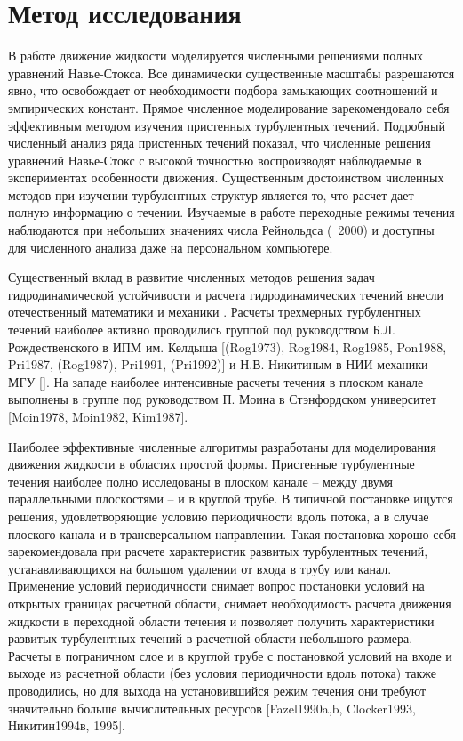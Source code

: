 
\chapter{Метод исследования}

В работе движение жидкости моделируется численными решениями полных уравнений Навье-Стокса. Все динамически существенные масштабы разрешаются явно, что освобождает от необходимости подбора замыкающих соотношений и эмпирических констант. Прямое численное моделирование зарекомендовало себя эффективным методом изучения пристенных турбулентных течений. Подробный численный анализ ряда пристенных течений показал, что численные решения уравнений Навье-Стокс с высокой точностью воспроизводят наблюдаемые в экспериментах особенности движения. Существенным достоинством численных методов при изучении турбулентных структур является то, что расчет дает полную информацию о течении. Изучаемые в работе переходные режимы течения наблюдаются при небольших значениях числа Рейнольдса (~2000) и доступны для численного анализа даже на персональном компьютере. 

Существенный вклад в развитие численных методов решения задач гидродинамической устойчивости и расчета гидродинамических течений внесли отечественный математики и механики \cite{Lad1970, Jud1984, Bab1986, Ger1972, Sch1973, Gold1977, Bel1984, Sch2010, Kul2014}. Расчеты трехмерных турбулентных течений наиболее активно проводились группой под руководством Б.Л. Рождественского в ИПМ им. Келдыша [(Rog1973), Rog1984, Rog1985, Pon1988, Pri1987, (Rog1987), Pri1991, (Pri1992)] и Н.В. Никитиным в НИИ механики МГУ []. На западе наиболее интенсивные расчеты течения в плоском канале выполнены в группе под руководством П. Моина в Стэнфордском университет [Moin1978, Moin1982, Kim1987]. 

Наиболее эффективные численные алгоритмы разработаны для моделирования движения жидкости в областях простой формы. Пристенные турбулентные течения наиболее полно исследованы в плоском канале -- между двумя параллельными плоскостями -- и в круглой трубе. В типичной постановке ищутся решения, удовлетворяющие условию периодичности вдоль потока, а в случае плоского канала и в трансверсальном направлении. Такая постановка хорошо себя зарекомендовала при расчете характеристик развитых турбулентных течений, устанавливающихся на большом удалении от входа в трубу или канал. Применение условий периодичности снимает вопрос постановки условий на открытых границах расчетной области, снимает необходимость расчета движения жидкости в переходной области течения и позволяет получить характеристики развитых турбулентных течений в расчетной области небольшого размера. Расчеты в пограничном слое и в круглой трубе с постановкой условий на входе и выходе из расчетной области (без условия периодичности вдоль потока) также проводились, но для выхода на установившийся режим течения они требуют значительно больше вычислительных ресурсов [Fazel1990a,b, Clocker1993, Никитин1994в, 1995].  

